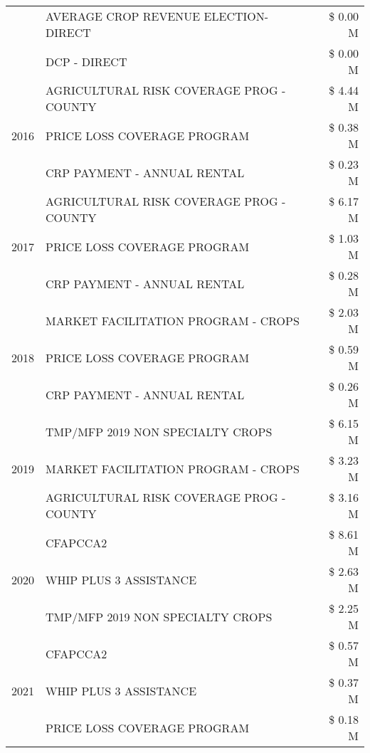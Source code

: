 \begin{tabular}{llr}
 & AVERAGE CROP REVENUE ELECTION-DIRECT & \$ 0.00 M \\
 & DCP - DIRECT & \$ 0.00 M \\
\cline{1-3}
\multirow[t]{3}{*}{2016} & AGRICULTURAL RISK COVERAGE PROG - COUNTY      & \$ 4.44 M \\
 & PRICE LOSS COVERAGE PROGRAM                   & \$ 0.38 M \\
 & CRP PAYMENT - ANNUAL RENTAL                   & \$ 0.23 M \\
\cline{1-3}
\multirow[t]{3}{*}{2017} & AGRICULTURAL RISK COVERAGE PROG - COUNTY & \$ 6.17 M \\
 & PRICE LOSS COVERAGE PROGRAM & \$ 1.03 M \\
 & CRP PAYMENT - ANNUAL RENTAL & \$ 0.28 M \\
\cline{1-3}
\multirow[t]{3}{*}{2018} & MARKET FACILITATION PROGRAM - CROPS & \$ 2.03 M \\
 & PRICE LOSS COVERAGE PROGRAM & \$ 0.59 M \\
 & CRP PAYMENT - ANNUAL RENTAL & \$ 0.26 M \\
\cline{1-3}
\multirow[t]{3}{*}{2019} & TMP/MFP 2019 NON SPECIALTY CROPS & \$ 6.15 M \\
 & MARKET FACILITATION PROGRAM - CROPS & \$ 3.23 M \\
 & AGRICULTURAL RISK COVERAGE PROG - COUNTY & \$ 3.16 M \\
\cline{1-3}
\multirow[t]{3}{*}{2020} & CFAPCCA2 & \$ 8.61 M \\
 & WHIP PLUS 3 ASSISTANCE & \$ 2.63 M \\
 & TMP/MFP 2019 NON SPECIALTY CROPS & \$ 2.25 M \\
\cline{1-3}
\multirow[t]{3}{*}{2021} & CFAPCCA2 & \$ 0.57 M \\
 & WHIP PLUS 3 ASSISTANCE & \$ 0.37 M \\
 & PRICE LOSS COVERAGE PROGRAM & \$ 0.18 M \\
\cline{1-3}
\bottomrule
\end{tabular}
